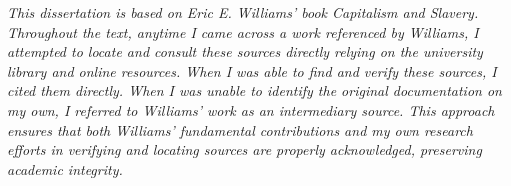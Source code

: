 \thispagestyle{empty}
\vspace*{\fill}
\noindent\textit{This dissertation is based on Eric E. Williams' book Capitalism and Slavery. Throughout the text, anytime I came across a work referenced by Williams, I attempted to locate and consult these sources directly relying on the university library and online resources. When I was able to find and verify these sources, I cited them directly. When I was unable to identify the original documentation on my own, I referred to Williams' work as an intermediary source. This approach ensures that both Williams’ fundamental contributions and my own research efforts in verifying and locating sources are properly acknowledged, preserving academic integrity.}
\vspace*{\fill}